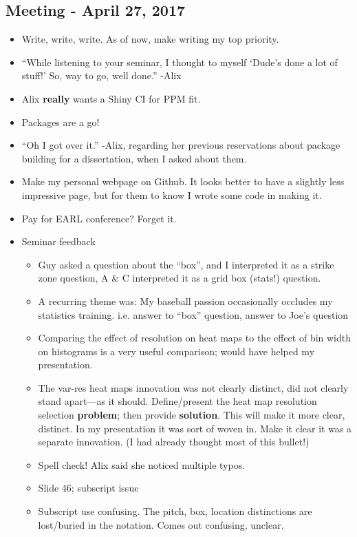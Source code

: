 \documentclass{article}
\begin{document}
\subsection*{Meeting - April 27, 2017}
\begin{itemize}
\item Write, write, write. As of now, make writing my top priority.
\item ``While listening to your seminar, I thought to myself `Dude's done a lot of stuff!' So, way to go, well done.'' -Alix
\item Alix {\bf really} wants a Shiny CI for PPM fit.
\item Packages are a go! 
\item ``Oh I got over it.'' -Alix, regarding her previous reservations about package building for a dissertation, when I asked about them.
\item Make my personal webpage on Github. It looks better to have a slightly less impressive page, but for them to know I wrote some code in making it.
\item Pay for EARL conference? Forget it.
\item Seminar feedback
  \begin{itemize}
  \item Guy asked a question about the ``box'', and I interpreted it as a strike zone question, A \& C interpreted it as a grid box (stats!) question. 
  \item A recurring theme was: My baseball passion occasionally occludes my statistics training. i.e. answer to ``box'' question, answer to Joe's question
  \item Comparing the effect of resolution on heat maps to the effect of bin width on histograms is a very useful comparison; would have helped my presentation.
  \item The var-res heat maps innovation was not clearly distinct, did not clearly stand apart---as it should. Define/present the heat map resolution selection {\bf problem}; then provide {\bf solution}. This will make it more clear, distinct. In my presentation it was sort of woven in. Make it clear it was a separate innovation. (I had already thought most of this bullet!)
  \item Spell check! Alix said she noticed multiple typos.
  \item Slide 46; subscript issue
  \item Subscript use confusing. The pitch, box, location distinctions are lost/buried in the notation. Comes out confusing, unclear.

\end{itemize}
\end{itemize}
\end{document}
